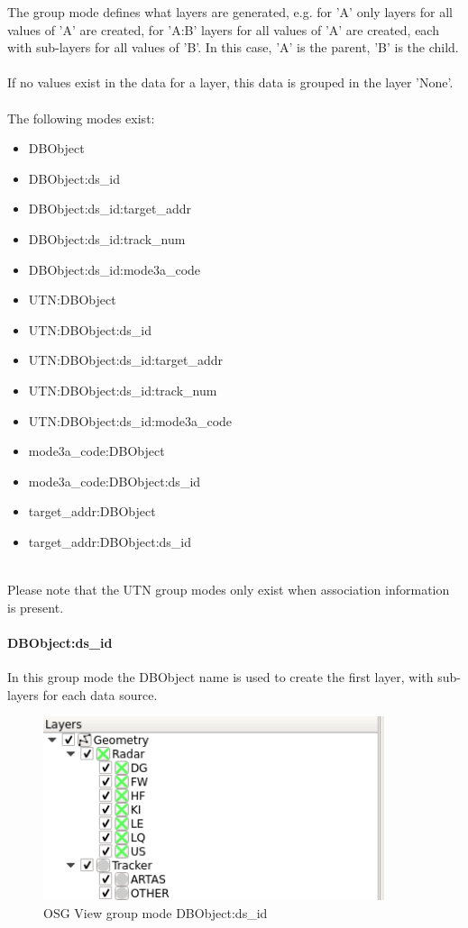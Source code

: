 The group mode defines what layers are generated, e.g. for 'A' only layers for all values of 'A' are created, for 'A:B' layers for all values of 'A' are created, each with sub-layers for all values of 'B'. In this case, 'A' is the parent, 'B' is the child. \\\\

If no values exist in the data for a layer, this data is grouped in the layer 'None'.\\\\

The following modes exist: \\

\begin{itemize}
 \item DBObject
 \item DBObject:ds\_id
 \item DBObject:ds\_id:target\_addr
 \item DBObject:ds\_id:track\_num
 \item DBObject:ds\_id:mode3a\_code
 \item UTN:DBObject
 \item UTN:DBObject:ds\_id
 \item UTN:DBObject:ds\_id:target\_addr
 \item UTN:DBObject:ds\_id:track\_num
 \item UTN:DBObject:ds\_id:mode3a\_code
 \item mode3a\_code:DBObject
 \item mode3a\_code:DBObject:ds\_id
 \item target\_addr:DBObject
 \item target\_addr:DBObject:ds\_id
\end{itemize}
\  \\

Please note that the UTN group modes only exist when association information is present.

\paragraph{DBObject:ds\_id}

In this group mode the DBObject name is used to create the first layer, with sub-layers for each data source.

\begin{figure}[H]
    \includegraphics[width=10cm,frame]{../screenshots/osgview_group_dbo_ds.png}
  \caption{OSG View group mode DBObject:ds\_id}
\end{figure}

